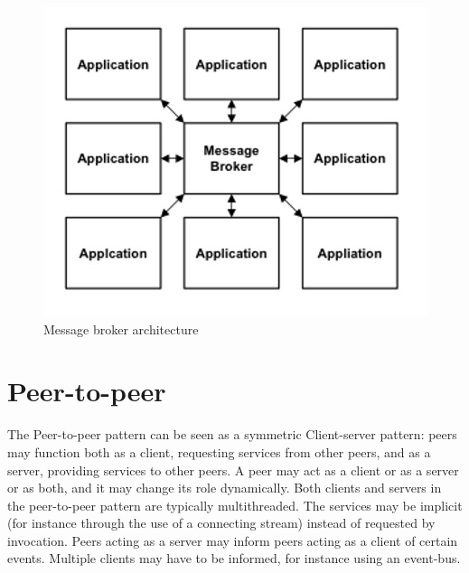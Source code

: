 \documentclass{article}
\begin{document}
\begin{figure}[h]
\centering
\includegraphics[scale=0.8]{mbr.jpg}
\caption{Message broker architecture}
\label{fig_mbr}
\end{figure}
\newpage



\section{Peer-to-peer}
The Peer-to-peer pattern can be seen as a symmetric Client-server pattern: peers may function both as a client, requesting services from other peers, and as a server, providing services to other peers. A peer may act as a client or as a server or as both, and it may change its role dynamically. Both clients and servers in the peer-to-peer pattern are typically multithreaded. The services may be implicit (for instance through the use of a connecting stream) instead of requested by invocation. Peers acting as a server may inform peers acting as a client of certain events. Multiple clients may have to be informed, for instance using an event-bus.\\\\
\end{document}

